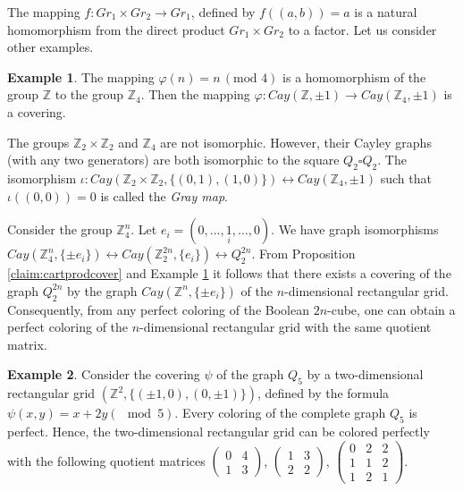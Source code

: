 \documentclass[11pt]{article}
\theoremstyle{definition}
\newtheorem{example}{Example}[section]
\begin{document}
{{{The mapping $f:Gr_1\times Gr_2\rightarrow Gr_1$, defined
by $f((a,b))=a$
is a natural
homomorphism from the direct product $Gr_1\times Gr_2$ to
a factor. Let us consider other examples.

\begin{example}\label{ex:coverZ}
The mapping $\varphi(n)= n\,(\mbox{mod }4)$ is a homomorphism
of the group $\mathbb{Z}$ to the group $\mathbb{Z}_4$. Then the mapping
$\varphi: Cay(\mathbb{Z},\pm1)\rightarrow Cay(\mathbb{Z}_4,\pm 1)$
is a covering.
\end{example}

The groups $\mathbb{Z}_2\times \mathbb{Z}_2$ and $\mathbb{Z}_4$ are not
isomorphic. However, their Cayley graphs (with any two generators)
are both  isomorphic to the square $Q_2\square Q_2$. The isomorphism
$\iota:Cay(\mathbb{Z}_2\times \mathbb{Z}_2, \{(0,1),(1,0)\})
\leftrightarrow Cay(\mathbb{Z}_4,\pm1)$ such that
$\iota((0,0))=0$ is called the {\sl Gray map}.

Consider the group $\mathbb{Z}^n_4$. Let $e_i=(0,\dots,\underset
i{1},\dots,0)$. We have graph isomorphisms $Cay(\mathbb{Z}^n_4,\{\pm
e_i\})\leftrightarrow Cay(\mathbb{Z}^{2n}_2,\{e_i\})\leftrightarrow
Q_2^{2n}$. From Proposition \ref{claim:cartprodcover} and Example
\ref{ex:coverZ} it follows that there exists a covering of the graph $Q_2^{2n}$
by the graph $Cay(\mathbb{Z}^n,\{\pm
e_i\})$ of the $n$-dimensional rectangular grid. Consequently, from any perfect coloring of the Boolean  $2n$-cube, one can obtain a perfect coloring of the $n$-dimensional rectangular grid with the same quotient matrix.

\begin{example}\label{exSh}
Consider the covering $\psi$ of the graph $Q_5$ by a two-dimensional rectangular
grid $(\mathbb{Z}^2, \{(\pm1,0), (0,\pm1)\})$,
defined by the formula $\psi(x,y)=x+2y(\mod 5)$. Every coloring of the complete
graph $Q_5$ is perfect. Hence, the two-dimensional rectangular
grid can be colored perfectly with the following quotient matrices $\begin{pmatrix}
0 & 4 \\
1 & 3
\end{pmatrix}$,
$\begin{pmatrix}
1 & 3 \\
2 & 2
\end{pmatrix}$,
$\begin{pmatrix}
0 & 2 & 2 \\
1 & 1 & 2 \\
1 & 2 &1
\end{pmatrix}$.
\end{example}


}}}
\end{document}
